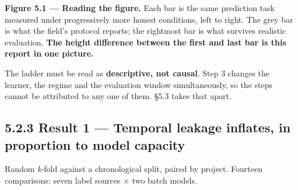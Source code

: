 \textbf{Figure 5.1 --- Reading the figure.} Each bar is the same
prediction task measured under progressively more honest conditions,
left to right. The grey bar is what the field's protocol reports; the
rightmost bar is what survives realistic evaluation. \textbf{The height
difference between the first and last bar is this report in one
picture.}

The ladder must be read as \textbf{descriptive, not causal}. Step 3
changes the learner, the regime and the evaluation window
simultaneously, so the steps cannot be attributed to any one of them.
\S{}5.3 takes that apart.

\subsection{5.2.3 Result 1 --- Temporal leakage inflates, in proportion
to model
capacity}\label{result-1-temporal-leakage-inflates-in-proportion-to-model-capacity}

Random \emph{k}-fold against a chronological split, paired by project.
Fourteen comparisons: seven label sources \ensuremath{\times} two batch models.


